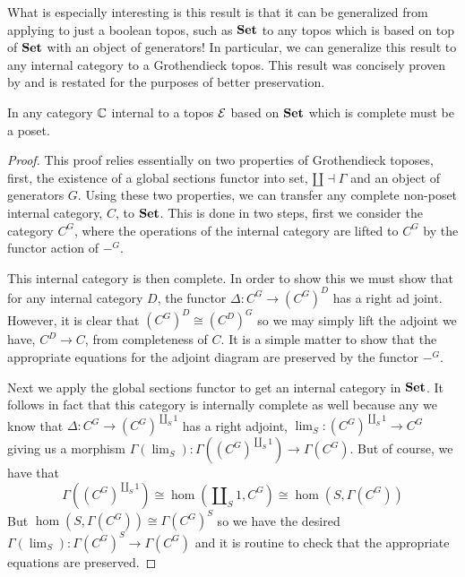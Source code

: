 What is especially interesting is this result is that it can be
generalized from applying to just a boolean topos, such as $\mathbf{Set}$ to
any topos which is based on top of $\mathbf{Set}$ with an object of
generators! In particular, we can generalize this result to any
internal category to a Grothendieck topos. This result was concisely
proven by \citet{Gubkin:10} and is restated for the purposes of better
preservation.
\begin{thm}\label{thm:freyd:grothendieck}
  In any category $\mathbb{C}$ internal to a topos $\mathcal{E}$ based on $\mathbf{Set}$
  which is complete must be a poset.
\end{thm}
\begin{proof}
  This proof relies essentially on two properties of Grothendieck
  toposes, first, the existence of a global sections functor into set,
  $\amalg \dashv \Gamma$ and an object of generators $G$. Using these
  two properties, we can transfer any complete non-poset internal
  category, $C$, to $\mathbf{Set}$. This is done in two steps, first we
  consider the category $C^G$, where the operations of the internal
  category are lifted to $C^G$ by the functor action of $-^G$.

  This internal category is then complete. In order to show this we
  must show that for any internal category $D$, the functor
  $\Delta : C^G \to (C^G)^D$ has a right ad joint. However, it is
  clear that $(C^G)^D \cong (C^D)^G$ so we may simply lift the adjoint
  we have, $C^D \to C$, from completeness of $C$. It is a simple
  matter to show that the appropriate equations for the adjoint
  diagram are preserved by the functor $-^G$.

  Next we apply the global sections functor to get an internal
  category in $\mathbf{Set}$. It follows in fact that this category is
  internally complete as well because any we know that
  $\Delta : C^G \to (C^G)^{\amalg_S 1}$ has a right adjoint,
  $\lim_S : (C^G)^{\amalg_S 1} \to C^G$ giving us a morphism
  $\Gamma(\lim_S) : \Gamma((C^G)^{\amalg_S 1}) \to \Gamma(C^G)$. But
  of course, we have that
  \[
    \Gamma((C^G)^{\amalg_S 1}) \cong \hom(\amalg_S 1, C^G) \cong
    \hom(S, \Gamma(C^G))
  \]
  But $\hom(S, \Gamma(C^G)) \cong \Gamma(C^G)^S$ so we have the
  desired $\Gamma(\lim_S) : \Gamma(C^G)^S \to \Gamma(C^G)$ and it is
  routine to check that the appropriate equations are preserved.


\end{proof}
